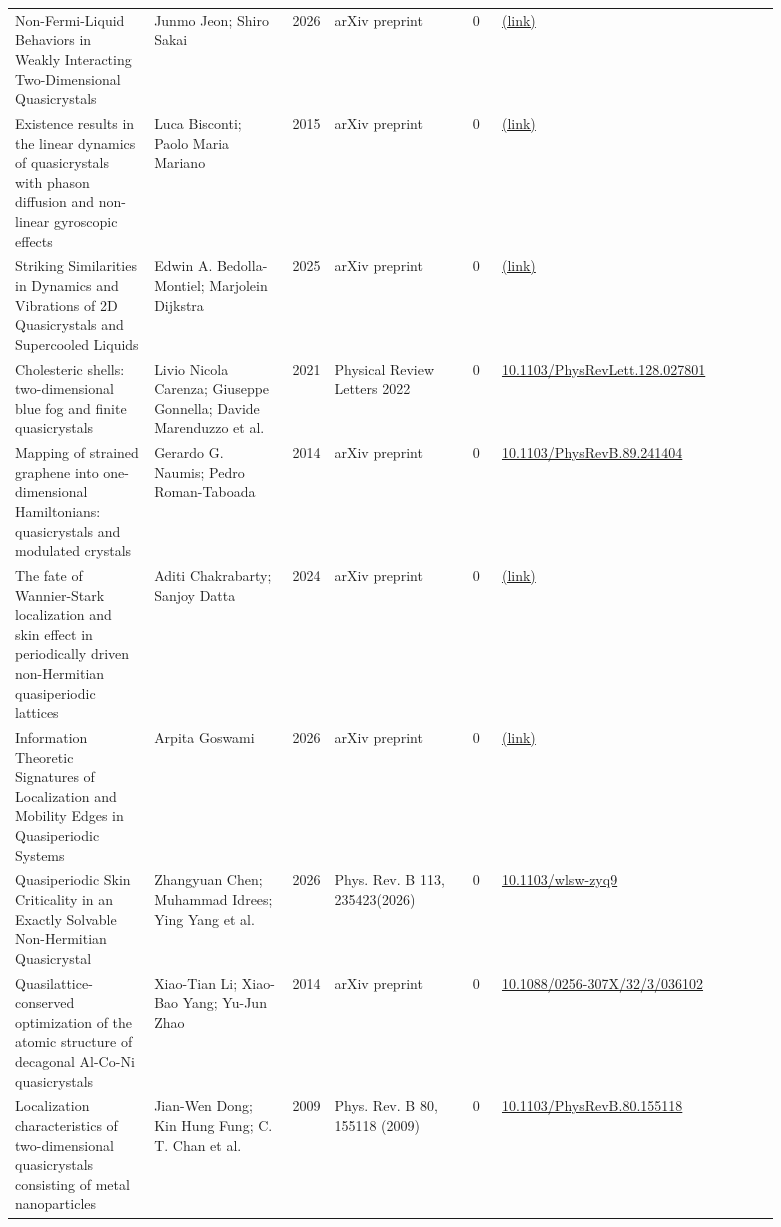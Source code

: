 \documentclass[10pt,a4paper]{article}
\begin{document}
{\begin{longtable}{p{0.192\linewidth}p{0.192\linewidth}p{0.043\linewidth}p{0.192\linewidth}p{0.043\linewidth}p{0.132\linewidth}p{0.096\linewidth}}
Non-Fermi-Liquid Behaviors in Weakly Interacting Two-Dimensional Quasicrystals & Junmo Jeon; Shiro Sakai & 2026 & arXiv preprint & 0 & \href{http://arxiv.org/abs/2607.18394v1}{(link)} &  \\
Existence results in the linear dynamics of quasicrystals with phason diffusion and non-linear gyroscopic effects & Luca Bisconti; Paolo Maria Mariano & 2015 & arXiv preprint & 0 & \href{http://arxiv.org/abs/1511.06646v1}{(link)} &  \\
Striking Similarities in Dynamics and Vibrations of 2D Quasicrystals and Supercooled Liquids & Edwin A. Bedolla-Montiel; Marjolein Dijkstra & 2025 & arXiv preprint & 0 & \href{http://arxiv.org/abs/2508.18856v2}{(link)} &  \\
Cholesteric shells: two-dimensional blue fog and finite quasicrystals & Livio Nicola Carenza; Giuseppe Gonnella; Davide Marenduzzo et al. & 2021 & Physical Review Letters 2022 & 0 & \href{https://doi.org/10.1103/PhysRevLett.128.027801}{10.1103/PhysRevLett.128.027801} &  \\
Mapping of strained graphene into one-dimensional Hamiltonians: quasicrystals and modulated crystals & Gerardo G. Naumis; Pedro Roman-Taboada & 2014 & arXiv preprint & 0 & \href{https://doi.org/10.1103/PhysRevB.89.241404}{10.1103/PhysRevB.89.241404} &  \\
The fate of Wannier-Stark localization and skin effect in periodically driven non-Hermitian quasiperiodic lattices & Aditi Chakrabarty; Sanjoy Datta & 2024 & arXiv preprint & 0 & \href{http://arxiv.org/abs/2412.11740v1}{(link)} &  \\
Information Theoretic Signatures of Localization and Mobility Edges in Quasiperiodic Systems & Arpita Goswami & 2026 & arXiv preprint & 0 & \href{http://arxiv.org/abs/2603.27175v1}{(link)} &  \\
Quasiperiodic Skin Criticality in an Exactly Solvable Non-Hermitian Quasicrystal & Zhangyuan Chen; Muhammad Idrees; Ying Yang et al. & 2026 & Phys. Rev. B 113, 235423(2026) & 0 & \href{https://doi.org/10.1103/wlsw-zyq9}{10.1103/wlsw-zyq9} &  \\
Quasilattice-conserved optimization of the atomic structure of decagonal Al-Co-Ni quasicrystals & Xiao-Tian Li; Xiao-Bao Yang; Yu-Jun Zhao & 2014 & arXiv preprint & 0 & \href{https://doi.org/10.1088/0256-307X/32/3/036102}{10.1088/0256-307X/32/3/036102} &  \\
Localization characteristics of two-dimensional quasicrystals consisting of metal nanoparticles & Jian-Wen Dong; Kin Hung Fung; C. T. Chan et al. & 2009 & Phys. Rev. B 80, 155118 (2009) & 0 & \href{https://doi.org/10.1103/PhysRevB.80.155118}{10.1103/PhysRevB.80.155118} &  \\

\end{longtable}}
\end{document}
